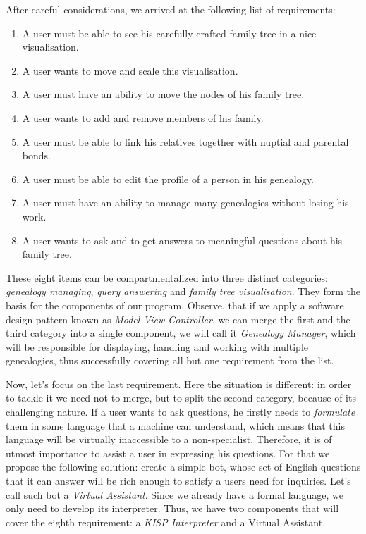     After careful considerations, we arrived at the following list of requirements:
    \begin{enumerate}
        \item{A user must be able to see his carefully crafted family tree in a nice visualisation.}
        \item{A user wants to move and scale this visualisation.}
        \item{A user must have an ability to move the nodes of his family tree.}
        \item{A user wants to add and remove members of his family.}
        \item{A user must be able to link his relatives together with nuptial and parental bonds.}
        \item{A user must be able to edit the profile of a person in his genealogy.}
        \item{A user must have an ability to manage many genealogies without losing his work.}
        \item{A user wants to ask and to get answers to meaningful questions about his family tree.}
    \end{enumerate}
    These eight items can be compartmentalized into three distinct categories: \textit{genealogy managing}, \textit{query answering}
    and \textit{family tree visualisation}. They form the basis for the components of our program. Observe, that if we apply a
    software design pattern known as \textit{Model-View-Controller}, we can merge the first and the third category into a single
    component, we will call it \textit{Genealogy Manager}, which will be responsible for displaying, handling and working with multiple
    genealogies, thus successfully covering all but one requirement from the list.

    Now, let's focus on the last requirement. Here the situation is different: in order to tackle it we need not to merge, but to
    split the second category, because of its challenging nature. If a user wants to ask questions, he firstly needs to
    \textit{formulate} them in some language that a machine can understand, which means that this language will be virtually
    inaccessible to a non-specialist. Therefore, it is of utmost importance to assist a user in expressing his questions.
    For that we propose the following solution: create a simple bot, whose set of English questions that it can answer will be rich
    enough to satisfy a users need for inquiries. Let's call such bot a \textit{Virtual Assistant}.
    Since we already have a formal language, we only need to develop its interpreter. Thus, we have two components that will cover the
    eighth requirement: a \textit{KISP Interpreter} and a Virtual Assistant.


